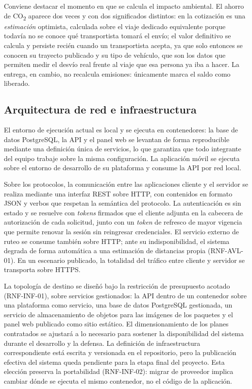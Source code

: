 {Conviene destacar el momento en que se calcula el impacto ambiental. El ahorro de CO\textsubscript{2} aparece dos veces y con dos significados distintos: en la cotización es una \emph{estimación} optimista, calculada sobre el viaje dedicado equivalente porque todavía no se conoce qué transportista tomará el envío; el valor definitivo se calcula y persiste recién cuando un transportista acepta, ya que solo entonces se conocen su trayecto publicado y su tipo de vehículo, que son los datos que permiten medir el desvío real frente al viaje que esa persona ya iba a hacer. La entrega, en cambio, no recalcula emisiones: únicamente marca el saldo como liberado.

\subsection{Arquitectura de red e infraestructura}

El entorno de ejecución actual es local y se ejecuta en contenedores: la base de datos PostgreSQL, la API y el panel web se levantan de forma reproducible mediante una definición única de servicios, lo que garantiza que todo integrante del equipo trabaje sobre la misma configuración. La aplicación móvil se ejecuta sobre el entorno de desarrollo de su plataforma y consume la API por red local.

Sobre los protocolos, la comunicación entre las aplicaciones cliente y el servidor se realiza mediante una interfaz REST sobre HTTP, con contenidos en formato JSON y verbos que respetan la semántica del protocolo. La autenticación es sin estado y se resuelve con \emph{tokens} firmados que el cliente adjunta en la cabecera de autorización de cada solicitud, junto con un \emph{token} de refresco de mayor vigencia que permite renovar la sesión sin reingresar credenciales. El servicio externo de ruteo se consume también sobre HTTP; ante su indisponibilidad, el sistema degrada de forma automática a una estimación de distancias propia (RNF-AVL-01). En un escenario publicado, la totalidad del tráfico entre cliente y servidor se transporta sobre HTTPS.

La topología de destino se diseñó bajo la restricción de presupuesto acotado (RNF-INF-01), sobre servicios gestionados: la API dentro de un contenedor sobre una plataforma como servicio, una base de datos PostgreSQL gestionada, un servicio de almacenamiento de objetos para las imágenes de los paquetes y el panel web publicado como sitio estático. El dimensionamiento de los planes contratados se ajustará a lo necesario para sostener la disponibilidad del sistema durante el desarrollo y la defensa. La definición de infraestructura correspondiente está escrita y versionada en el repositorio, pero la publicación efectiva del sistema queda pendiente para la etapa final del proyecto. Esta elección preserva la portabilidad (RNF-INF-02): migrar de proveedor implica cambiar dónde se ejecuta el mismo contenedor, no el código de la aplicación.

}
